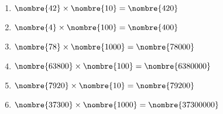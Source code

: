\exo{}

\begin{multicols}{2}
\begin{enumerate}[itemsep=.5em]
	\item $\nombre{42} \times \nombre{10}=\nombre{420}$
	\item $\nombre{4} \times \nombre{100}=\nombre{400}$
	\item $\nombre{78} \times \nombre{1000}=\nombre{78000}$
	\item $\nombre{63800} \times \nombre{100}=\nombre{6380000}$
	\item $\nombre{7920} \times \nombre{10}=\nombre{79200}$
	\item $\nombre{37300} \times \nombre{1000}=\nombre{37300000}$
\end{enumerate}
\end{multicols}

